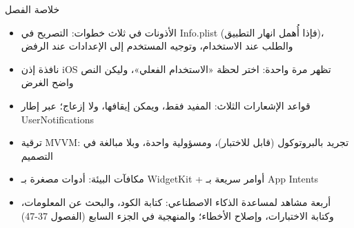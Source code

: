 \begin{tcbsummary}{خلاصة الفصل}
\begin{itemize}
  \item الأذونات في ثلاث خطوات: التصريح في Info.plist (فإذا أُهمل انهار التطبيق)، والطلب عند الاستخدام، وتوجيه المستخدم إلى الإعدادات عند الرفض
  \item نافذة إذن iOS تظهر مرة واحدة: اختر لحظة «الاستخدام الفعلي»، وليكن النص واضح الغرض
  \item قواعد الإشعارات الثلاث: المفيد فقط، ويمكن إيقافها، ولا إزعاج؛ عبر إطار UserNotifications
  \item ترقية MVVM: تجريد بالبروتوكول (قابل للاختبار)، ومسؤولية واحدة، وبلا مبالغة في التصميم
  \item مكافآت البيئة: أدوات مصغرة بـ WidgetKit + أوامر سريعة بـ App Intents
  \item أربعة مشاهد لمساعدة الذكاء الاصطناعي: كتابة الكود، والبحث عن المعلومات، وكتابة الاختبارات، وإصلاح الأخطاء؛ والمنهجية في الجزء السابع (الفصول 37-47)
\end{itemize}

\end{tcbsummary}
